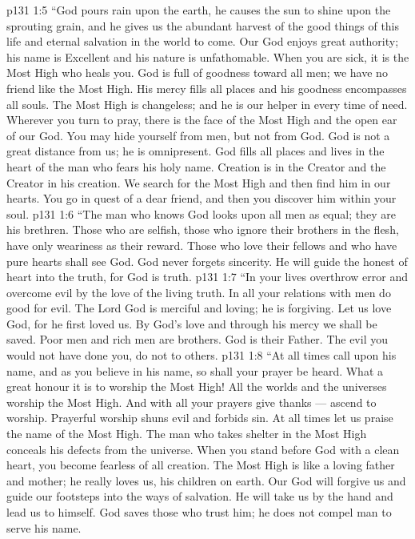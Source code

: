 \vs p131 1:5 “God pours rain upon the earth, he causes the sun to shine upon the sprouting grain, and he gives us the abundant harvest of the good things of this life and eternal salvation in the world to come. Our God enjoys great authority; his name is Excellent and his nature is unfathomable. When you are sick, it is the Most High who heals you. God is full of goodness toward all men; we have no friend like the Most High. His mercy fills all places and his goodness encompasses all souls. The Most High is changeless; and he is our helper in every time of need. Wherever you turn to pray, there is the face of the Most High and the open ear of our God. You may hide yourself from men, but not from God. God is not a great distance from us; he is omnipresent. God fills all places and lives in the heart of the man who fears his holy name. Creation is in the Creator and the Creator in his creation. We search for the Most High and then find him in our hearts. You go in quest of a dear friend, and then you discover him within your soul.
\vs p131 1:6 “The man who knows God looks upon all men as equal; they are his brethren. Those who are selfish, those who ignore their brothers in the flesh, have only weariness as their reward. Those who love their fellows and who have pure hearts shall see God. God never forgets sincerity. He will guide the honest of heart into the truth, for God is truth.
\vs p131 1:7 “In your lives overthrow error and overcome evil by the love of the living truth. In all your relations with men do good for evil. The Lord God is merciful and loving; he is forgiving. Let us love God, for he first loved us. By God’s love and through his mercy we shall be saved. Poor men and rich men are brothers. God is their Father. The evil you would not have done you, do not to others.
\vs p131 1:8 “At all times call upon his name, and as you believe in his name, so shall your prayer be heard. What a great honour it is to worship the Most High! All the worlds and the universes worship the Most High. And with all your prayers give thanks --- ascend to worship. Prayerful worship shuns evil and forbids sin. At all times let us praise the name of the Most High. The man who takes shelter in the Most High conceals his defects from the universe. When you stand before God with a clean heart, you become fearless of all creation. The Most High is like a loving father and mother; he really loves us, his children on earth. Our God will forgive us and guide our footsteps into the ways of salvation. He will take us by the hand and lead us to himself. God saves those who trust him; he does not compel man to serve his name.
